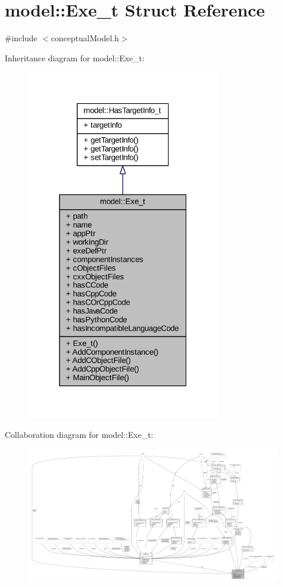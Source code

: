\hypertarget{structmodel_1_1_exe__t}{}\section{model\+:\+:Exe\+\_\+t Struct Reference}
\label{structmodel_1_1_exe__t}


{\ttfamily \#include $<$conceptual\+Model.\+h$>$}



Inheritance diagram for model\+:\+:Exe\+\_\+t\+:
\nopagebreak
\begin{figure}[H]
\begin{center}
\leavevmode
\includegraphics[width=241pt]{structmodel_1_1_exe__t__inherit__graph}
\end{center}
\end{figure}


Collaboration diagram for model\+:\+:Exe\+\_\+t\+:
\nopagebreak
\begin{figure}[H]
\begin{center}
\leavevmode
\includegraphics[width=350pt]{structmodel_1_1_exe__t__coll__graph}
\end{center}
\end{figure}
